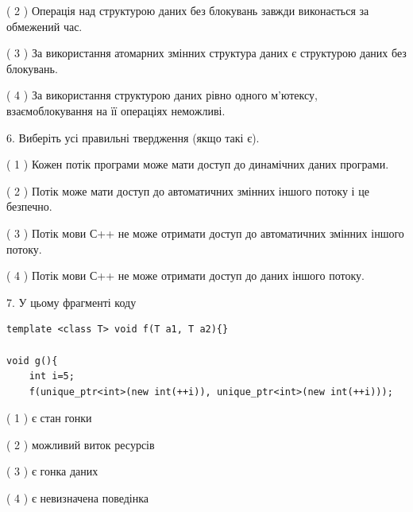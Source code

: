 \documentclass[12pt, ukrainian]{article}
\begin{document}
\begin {large}
{( 2 ) Операція над структурою даних без блокувань завжди виконається за обмежений час.%

( 3 ) За використання атомарних змінних структура даних є структурою даних без блокувань.%

( 4 ) За використання структурою даних рівно одного м’ютексу, взаємоблокування на її операціях неможливі.%
\newpage



\vspace{5mm}
6. Виберіть усі правильні твердження (якщо такі є).\par
\vspace{2mm}

( 1 ) Кожен потік програми може мати доступ до динамічних даних програми.%

( 2 ) Потік може мати доступ до автоматичних змінних іншого потоку і це безпечно.%

( 3 ) Потік мови С++ не може отримати доступ до автоматичних змінних іншого потоку.%

( 4 ) Потік мови С++ не може отримати доступ до даних іншого потоку.%


\vspace{5mm}
7. У цьому фрагменті коду
\begin{verbatim}
template <class T> void f(T a1, T a2){}

void g(){
    int i=5;
    f(unique_ptr<int>(new int(++i)), unique_ptr<int>(new int(++i)));
\end{verbatim}

( 1 ) є стан гонки%

( 2 ) можливий виток ресурсів%

( 3 ) є гонка даних%

( 4 ) є невизначена поведінка%
}
\end {large}
\end{document}
